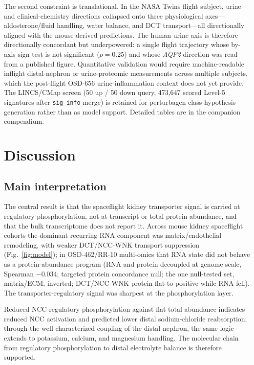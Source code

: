 \documentclass[11pt]{article}
\newcommand{\code}[1]{\texttt{#1}}
\newcommand{\gene}[1]{\textit{#1}}
\begin{document}
The second constraint is translational. In the NASA Twins flight subject, urine and clinical-chemistry directions collapsed onto three physiological axes---aldosterone/fluid handling, water balance, and DCT transport---all directionally aligned with the mouse-derived predictions. The human urine axis is therefore directionally concordant but underpowered: a single flight trajectory whose by-axis sign test is not significant ($p=0.25$) and whose \gene{AQP2} direction was read from a published figure. Quantitative validation would require machine-readable inflight distal-nephron or urine-proteomic measurements across multiple subjects, which the post-flight OSD-656 urine-inflammation context does not yet provide. The LINCS/CMap screen (50 up / 50 down query, 473,647 scored Level-5 signatures after \code{sig\_info} merge) is retained for perturbagen-class hypothesis generation rather than as model support. Detailed tables are in the companion compendium.

\section{Discussion}


\subsection{Main interpretation}

The central result is that the spaceflight kidney transporter signal is carried at regulatory phosphorylation, not at transcript or total-protein abundance, and that the bulk transcriptome does not report it. Across mouse kidney spaceflight cohorts the dominant recurring RNA component was matrix/endothelial remodeling, with weaker DCT/NCC-WNK transport suppression (Fig.~\ref{fig:model}); in OSD-462/RR-10 multi-omics that RNA state did not behave as a protein-abundance program (RNA and protein decoupled at genome scale, Spearman $-0.034$; targeted protein concordance null; the one null-tested set, matrix/ECM, inverted; DCT/NCC-WNK protein flat-to-positive while RNA fell). The transporter-regulatory signal was sharpest at the phosphorylation layer.

Reduced NCC regulatory phosphorylation against flat total abundance indicates reduced NCC activation and predicted lower distal sodium-chloride reabsorption; through the well-characterized coupling of the distal nephron, the same logic extends to potassium, calcium, and magnesium handling. The molecular chain from regulatory phosphorylation to distal electrolyte balance is therefore supported.
\end{document}
